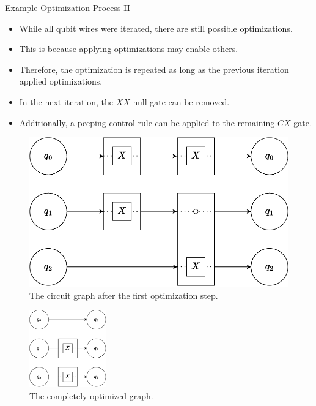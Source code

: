 \begin{frame}{Example Optimization Process II}
    \begin{itemize}
        \item While all qubit wires were iterated, there are still possible optimizations.
        \item This is because applying optimizations may enable others.
        \item Therefore, the optimization is repeated as long as the previous iteration applied optimizations.
        \item In the next iteration, the $XX$ null gate can be removed.
        \item Additionally, a peeping control rule can be applied to the remaining $CX$ gate.
    \end{itemize}
    \vfill
    \hfill
    \begin{minipage}{.40\textwidth}
        \begin{figure}[htp]
            \centering     
            \includegraphics[width=\textwidth]{../figures/drawio/circuit_graph_optimized_firststep.pdf}
            \caption{The circuit graph after the first optimization step.}
        \end{figure}
    \end{minipage}
    \hfill
    \begin{minipage}{.30\textwidth}
        \begin{figure}[htp]
            \centering     
            \includegraphics[width=9em]{../figures/drawio/circuit_graph_optimized_complete.pdf}
            \caption{The completely optimized graph.}
        \end{figure}
    \end{minipage}
    \hfill
\end{frame}
